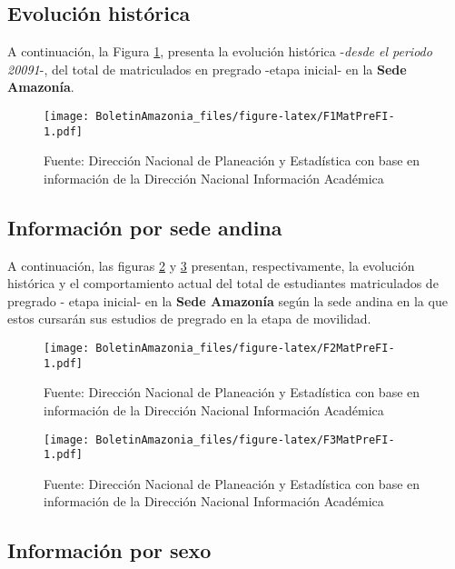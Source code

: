 \documentclass[
]{book}
\begin{document}
\hypertarget{evoluciuxf3n-histuxf3rica-5}{%
\subsection{Evolución histórica}\label{evoluciuxf3n-histuxf3rica-5}}

A continuación, la Figura \ref{fig:F1MatPreFI}, presenta la evolución histórica -\emph{desde el periodo 20091}-, del total de matriculados en pregrado -etapa inicial- en la \textbf{Sede Amazonía}.

\begin{figure}
\centering
\texttt{[image: BoletinAmazonia\_files/figure-latex/F1MatPreFI-1.pdf]}
\caption{\label{fig:F1MatPreFI}Fuente: Dirección Nacional de Planeación y Estadística con base en información de la Dirección Nacional Información Académica}
\end{figure}

\hypertarget{informaciuxf3n-por-sede-andina-1}{%
\subsection{Información por sede andina}\label{informaciuxf3n-por-sede-andina-1}}

A continuación, las figuras \ref{fig:F2MatPreFI} y \ref{fig:F3MatPreFI} presentan, respectivamente, la evolución histórica y el comportamiento actual del total de estudiantes matriculados de pregrado - etapa inicial- en la \textbf{Sede Amazonía} según la sede andina en la que estos cursarán sus estudios de pregrado en la etapa de movilidad.

\begin{figure}
\centering
\texttt{[image: BoletinAmazonia\_files/figure-latex/F2MatPreFI-1.pdf]}
\caption{\label{fig:F2MatPreFI}Fuente: Dirección Nacional de Planeación y Estadística con base en información de la Dirección Nacional Información Académica}
\end{figure}

\begin{figure}
\centering
\texttt{[image: BoletinAmazonia\_files/figure-latex/F3MatPreFI-1.pdf]}
\caption{\label{fig:F3MatPreFI}Fuente: Dirección Nacional de Planeación y Estadística con base en información de la Dirección Nacional Información Académica}
\end{figure}

\hypertarget{informaciuxf3n-por-sexo-5}{%
\subsection{Información por sexo}\label{informaciuxf3n-por-sexo-5}}
\end{document}
